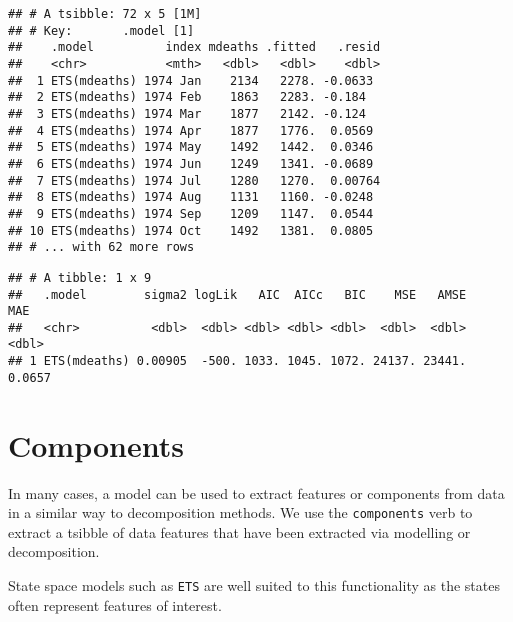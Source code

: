 \documentclass[]{book}
\newenvironment{Shaded}{\begin{snugshade}}{\end{snugshade}}
\newcommand{\NormalTok}[1]{#1}
\newcommand{\OperatorTok}[1]{\textcolor[rgb]{0.81,0.36,0.00}{\textbf{#1}}}
\newcommand{\StringTok}[1]{\textcolor[rgb]{0.31,0.60,0.02}{#1}}
\begin{document}
\begin{verbatim}
## # A tsibble: 72 x 5 [1M]
## # Key:       .model [1]
##    .model          index mdeaths .fitted   .resid
##    <chr>           <mth>   <dbl>   <dbl>    <dbl>
##  1 ETS(mdeaths) 1974 Jan    2134   2278. -0.0633 
##  2 ETS(mdeaths) 1974 Feb    1863   2283. -0.184  
##  3 ETS(mdeaths) 1974 Mar    1877   2142. -0.124  
##  4 ETS(mdeaths) 1974 Apr    1877   1776.  0.0569 
##  5 ETS(mdeaths) 1974 May    1492   1442.  0.0346 
##  6 ETS(mdeaths) 1974 Jun    1249   1341. -0.0689 
##  7 ETS(mdeaths) 1974 Jul    1280   1270.  0.00764
##  8 ETS(mdeaths) 1974 Aug    1131   1160. -0.0248 
##  9 ETS(mdeaths) 1974 Sep    1209   1147.  0.0544 
## 10 ETS(mdeaths) 1974 Oct    1492   1381.  0.0805 
## # ... with 62 more rows
\end{verbatim}

\begin{Shaded}
\end{Shaded}

\begin{Shaded}
\end{Shaded}

\begin{verbatim}
## # A tibble: 1 x 9
##   .model        sigma2 logLik   AIC  AICc   BIC    MSE   AMSE    MAE
##   <chr>          <dbl>  <dbl> <dbl> <dbl> <dbl>  <dbl>  <dbl>  <dbl>
## 1 ETS(mdeaths) 0.00905  -500. 1033. 1045. 1072. 24137. 23441. 0.0657
\end{verbatim}

\hypertarget{components}{%
\section{Components}\label{components}}

In many cases, a model can be used to extract features or components from data in a similar way to decomposition methods. We use the \texttt{components} verb to extract a tsibble of data features that have been extracted via modelling or decomposition.

State space models such as \texttt{ETS} are well suited to this functionality as the states often represent features of interest.
\end{document}
